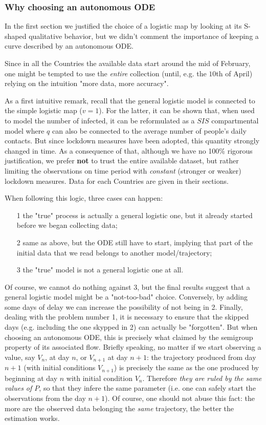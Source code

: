 \documentclass[8pt]{article}
\begin{document}
\subsubsection{Why choosing an autonomous ODE}
In the first section we justified the choice of a logistic map by looking
at its S-shaped qualitative behavior, but we didn't comment the
importance of keeping
a curve described by an autonomous ODE.


Since in all the Countries the available data start around the mid
of February, one might be tempted to use the \emph{entire}
collection (until, e.g. the $10$th of April)
relying on the intuition "more data, more accuracy".


As a first intuitive remark,
recall that the general logistic model is connected to the simple
logistic map ($v = 1$). For the latter, it can be shown that,
when used to model the number of infected,
it can be reformulated as a $SIS$ compartmental model
where $q$ can also be connected to the average number of people's
daily contacts.
But since lockdown measures have been adopted, this quantity
strongly changed in time. As a consequence of that, although
we have no 100\% rigorous justification,
we prefer \textbf{not} to trust the entire available dataset, but rather
limiting the observations on time period with
\emph{constant} (stronger or weaker) lockdown measures.
Data for each Countries
are given in their sections.


When following this logic, three cases can happen:
\begin{itemize}
	\item[1] the "true" process is actually a general logistic one,
		but it already started before we began collecting data;
	\item[2] same as above, but the ODE still have
		to start, implying that part of the
		initial data that we read belongs to
		another model/trajectory;
	\item[3] the "true" model is not a general logistic one at all.
\end{itemize}


Of course, we cannot do nothing against $3$, but the final results suggest
that a general logistic model might be a "not-too-bad" choice.
Conversely, by adding some days of delay we can increase the
possibility of not being in 2.
Finally, dealing with the problem number 1,
it is necessary to ensure that the skipped days 
(e.g. including the one skypped in 2)
can actually be "forgotten".
But when choosing an autonomous ODE, this is precisely what
claimed by the semigroup property of its associated flow.
Briefly speaking,
no matter if we start observing a value, say $V_n$, at 
day $n$, or $V_{n+1}$ at day $n+1$: 
the trajectory produced from day $n+1$ (with initial
conditions $V_{n+1}$) is precisely the same as the one
produced by beginning at day $n$ with initial condition $V_n$.
Therefore \emph{they are ruled by the same values of $P$},
so that they infere the same parameter (i.e. one can safely
start the observations from the day $n+1$).
Of course, one should not abuse this fact:
the more are the observed data belonging the \emph{same}
trajectory, the better the estimation works.
\end{document}
